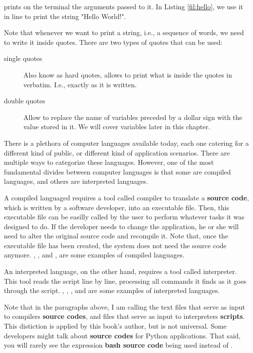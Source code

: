  prints on the terminal the arguments passed to it. In Listing \ref{fil:hello}, we use it in line  to print the string "Hello World!".

Note that whenever we want to print a string, i.e., a sequence of words, we need to write it inside quotes. There are two types of quotes that can be used:

\begin{description}
\item[single quotes] Also know as hard quotes, allows  to print what is inside the quotes in verbatim. I.e., exactly as it is written.
\item[double quotes] Allow  to replace the name of variables preceded by a dollar sign \mycommand{\$} with the value stored in it. We will cover variables later in this chapter.
\end{description}

\begin{my_box}
\label{box:compile_interpreted}
There is a plethora of computer languages available today, each one catering for a different kind of public, or different kind of application scenarios. There are multiple ways to categorize these languages. However, one of the most fundamental divides between computer languages is that some are compiled languages, and others are interpreted languages.

A compiled languaged requires a tool called compiler to translate a \textbf{source code}, which is written by a software developer, into an executable file. Then, this executable file can be easilly called by the user to perform whatever tasks it was designed to do. If the developer needs to change the application, he or she will need to alter the original source code and recompile it. Note that, once the executable file has been created, the system does not need the source code anymore.  , , and , are some examples of compiled languages.

An interpreted language, on the other hand, requires a tool called interpreter. This tool reads the script line by line, processing all commands it finds as it goes through the script. , , , and  are some examples of interpreted languages.

Note that in the paragraphs above, I am calling the text files that serve as input to compilers \textbf{source codes}, and files that serve as input to interpreters \textbf{scripts}. This distiction is applied by this book's author, but is not universal. Some developers might talk about \textbf{source codes} for Python applications. That said, you will rarely see the expression \textbf{bash source code} being used instead of .
\end{my_box}



